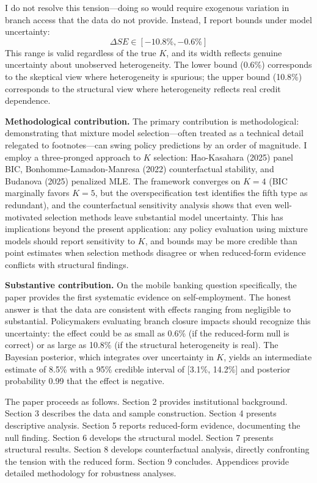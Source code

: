 \documentclass[12pt]{article}
\begin{document}
I do not resolve this tension---doing so would require exogenous variation in branch access that the data do not provide. Instead, I report bounds under model uncertainty:
\begin{equation*}
\Delta SE \in [-10.8\%, -0.6\%]
\end{equation*}
This range is valid regardless of the true $K$, and its width reflects genuine uncertainty about unobserved heterogeneity. The lower bound (0.6\%) corresponds to the skeptical view where heterogeneity is spurious; the upper bound (10.8\%) corresponds to the structural view where heterogeneity reflects real credit dependence.

\textbf{Methodological contribution.} The primary contribution is methodological: demonstrating that mixture model selection---often treated as a technical detail relegated to footnotes---can swing policy predictions by an order of magnitude. I employ a three-pronged approach to $K$ selection: Hao-Kasahara (2025) panel BIC, Bonhomme-Lamadon-Manresa (2022) counterfactual stability, and Budanova (2025) penalized MLE. The framework converges on $K=4$ (BIC marginally favors $K=5$, but the overspecification test identifies the fifth type as redundant), and the counterfactual sensitivity analysis shows that even well-motivated selection methods leave substantial model uncertainty. This has implications beyond the present application: any policy evaluation using mixture models should report sensitivity to $K$, and bounds may be more credible than point estimates when selection methods disagree or when reduced-form evidence conflicts with structural findings.

\textbf{Substantive contribution.} On the mobile banking question specifically, the paper provides the first systematic evidence on self-employment. The honest answer is that the data are consistent with effects ranging from negligible to substantial. Policymakers evaluating branch closure impacts should recognize this uncertainty: the effect could be as small as 0.6\% (if the reduced-form null is correct) or as large as 10.8\% (if the structural heterogeneity is real). The Bayesian posterior, which integrates over uncertainty in $K$, yields an intermediate estimate of 8.5\% with a 95\% credible interval of [3.1\%, 14.2\%] and posterior probability 0.99 that the effect is negative.

The paper proceeds as follows. Section 2 provides institutional background. Section 3 describes the data and sample construction. Section 4 presents descriptive analysis. Section 5 reports reduced-form evidence, documenting the null finding. Section 6 develops the structural model. Section 7 presents structural results. Section 8 develops counterfactual analysis, directly confronting the tension with the reduced form. Section 9 concludes. Appendices provide detailed methodology for robustness analyses.
\end{document}
